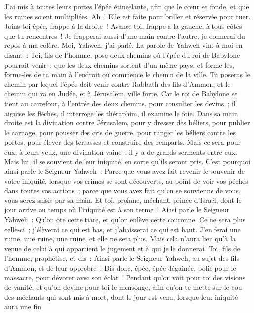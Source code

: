 \begin{multicols}{2}
J'ai mis à toutes leurs portes l'épée étincelante, afin que le cœur se fonde, et que les ruines soient multipliées. Ah~! Elle est faite pour briller et réservée pour tuer.
Joins-toi épée, frappe à la droite~! Avance-toi, frappe à la gauche, à tous côtés que tu rencontres~!
Je frapperai aussi d'une main contre l'autre, je donnerai du repos à ma colère. Moi, Yahweh, j'ai parlé.
La parole de Yahweh vint à moi en disant~:
Toi, fils de l'homme, pose deux chemins où l'épée du roi de Babylone pourrait venir~; que les deux chemins sortent d'un même pays, et forme-les, forme-les de ta main à l'endroit où commence le chemin de la ville.
Tu poseras le chemin par lequel l'épée doit venir contre Rabbath des fils d'Ammon, et le chemin qui va en Judée, et à Jérusalem, ville forte.
Car le roi de Babylone se tient au carrefour, à l'entrée des deux chemins, pour consulter les devins~; il aiguise les flèches, il interroge les théraphim, il examine le foie.
Dans sa main droite est la divination contre Jérusalem, pour y dresser des béliers, pour publier le carnage, pour pousser des cris de guerre, pour ranger les béliers contre les portes, pour élever des terrasses et construire des remparts.
Mais ce sera pour eux, à leurs yeux, une divination vaine~; il y a de grands serments entre eux. Mais lui, il se souvient de leur iniquité, en sorte qu'ils seront pris.
C'est pourquoi ainsi parle le Seigneur Yahweh~: Parce que vous avez fait revenir le souvenir de votre iniquité, lorsque vos crimes se sont découverts, au point de voir vos péchés dans toutes vos actions~; parce que vous avez fait qu'on se souvienne de vous, vous serez saisis par sa main.
Et toi, profane, méchant, prince d'Israël, dont le jour arrive au temps où l'iniquité est à son terme~!
Ainsi parle le Seigneur Yahweh~: Qu'on ôte cette tiare, et qu'on enlève cette couronne. Ce ne sera plus celle-ci~; j'élèverai ce qui est bas, et j'abaisserai ce qui est haut.
J'en ferai une ruine, une ruine, une ruine, et elle ne sera plus. Mais cela n'aura lieu qu'à la venue de celui à qui appartient le jugement et à qui je le donnerai.
Toi, fils de l'homme, prophétise, et dis~: Ainsi parle le Seigneur Yahweh, au sujet des fils d'Ammon, et de leur opprobre~: Dis donc, épée, épée dégainée, polie pour le massacre, pour dévorer avec son éclat~!
Pendant qu'on voit pour toi des visions de vanité, et qu'on devine pour toi le mensonge, afin qu'on te mette sur le cou des méchants qui sont mis à mort, dont le jour est venu, lorsque leur iniquité aura une fin.

\end{multicols}
